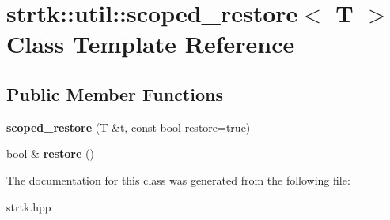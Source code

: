 \hypertarget{classstrtk_1_1util_1_1scoped__restore}{\section{strtk\-:\-:util\-:\-:scoped\-\_\-restore$<$ T $>$ Class Template Reference}
\label{classstrtk_1_1util_1_1scoped__restore}
}
\subsection*{Public Member Functions}
\begin{DoxyCompactItemize}
\item 
\hypertarget{classstrtk_1_1util_1_1scoped__restore_af6eaae4aa21efc7adb52066974149acf}{{\bfseries scoped\-\_\-restore} (T \&t, const bool restore=true)}\label{classstrtk_1_1util_1_1scoped__restore_af6eaae4aa21efc7adb52066974149acf}

\item 
\hypertarget{classstrtk_1_1util_1_1scoped__restore_a1c47f2f512fdc3390723e295f6cf281e}{bool \& {\bfseries restore} ()}\label{classstrtk_1_1util_1_1scoped__restore_a1c47f2f512fdc3390723e295f6cf281e}

\end{DoxyCompactItemize}


The documentation for this class was generated from the following file\-:\begin{DoxyCompactItemize}
\item 
strtk.\-hpp\end{DoxyCompactItemize}
